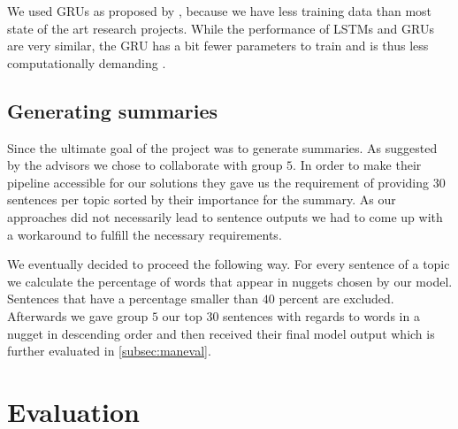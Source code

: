 \documentclass{article}
\begin{document}
We used GRUs as proposed by \citet{gru2014}, because we have less training data than most state of the art research projects. While the performance of LSTMs and GRUs are very similar, the GRU has a bit fewer parameters to train and is thus less computationally demanding \cite{cnn_rnn_comparative2017}.

\subsection{Generating summaries}
Since the ultimate goal of the project was to generate summaries. As suggested by the advisors we chose to collaborate with group $5$. In order to make their pipeline accessible for our solutions they gave us the requirement of providing 30 sentences per topic sorted by their importance for the summary. As our approaches did not necessarily lead to sentence outputs we had to come up with a workaround to fulfill the necessary requirements.  

We eventually decided to proceed the following way. For every sentence of a topic we calculate the percentage of words that appear in nuggets chosen by our model. Sentences that have a percentage smaller than $40$ percent are excluded. Afterwards we gave group $5$ our top $30$ sentences with regards to words in a nugget in descending order and then received their final model output which is further evaluated in \ref{subsec:maneval}.   
\section{Evaluation}
\label{sec:eval}
\end{document}
